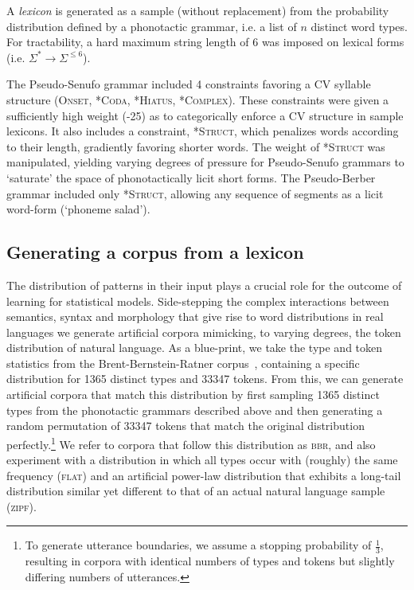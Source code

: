 \documentclass[11pt]{article}
\begin{document}
A \textit{lexicon} is generated as a sample (without replacement) from the probability distribution defined by a phonotactic grammar, i.e. a list of $n$ distinct word types. For tractability, a hard maximum string length of 6 was imposed on lexical forms (i.e. $\Sigma^* \to \Sigma^{\leq 6}$).

The Pseudo-Senufo grammar included 4 constraints favoring a CV syllable structure (\textsc{Onset, *Coda, *Hiatus, *Complex}). These constraints were given a sufficiently high weight (-25) as to categorically enforce a CV structure in sample lexicons. It also includes a constraint, \textsc{*Struct}, which penalizes words according to their length, gradiently favoring shorter words. The weight of \textsc{*Struct} was manipulated, yielding varying degrees of pressure for Pseudo-Senufo grammars to `saturate' the space of phonotactically licit short forms. The Pseudo-Berber grammar included only \textsc{*Struct}, allowing any sequence of segments as a licit word-form (`phoneme salad'). 

\subsection{Generating a corpus from a lexicon}

The distribution of patterns in their input plays a crucial role for the outcome of learning for statistical models. Side-stepping the complex interactions between semantics, syntax and morphology that give rise to word distributions in real languages we generate artificial corpora mimicking, to varying degrees, the token distribution of natural language. As a blue-print, we take the type and token statistics from the Brent-Bernstein-Ratner corpus~\cite{Brent99a}, containing a specific distribution for 1365 distinct types and 33347 tokens. From this, we can generate artificial corpora that match this distribution by first sampling 1365 distinct types from the phonotactic grammars described above and then generating a random permutation of 33347 tokens that match the original distribution perfectly.\footnote{To generate utterance boundaries, we assume a stopping probability of $\frac{1}{3}$, resulting in corpora with identical numbers of types and tokens but slightly differing numbers of utterances.} We refer to corpora that follow this distribution as \textsc{bbr}, and also experiment with a distribution in which all types occur with (roughly) the same frequency (\textsc{flat}) and an artificial power-law distribution that exhibits a long-tail distribution similar yet different to that of an actual natural language sample (\textsc{zipf}). 
\end{document}
